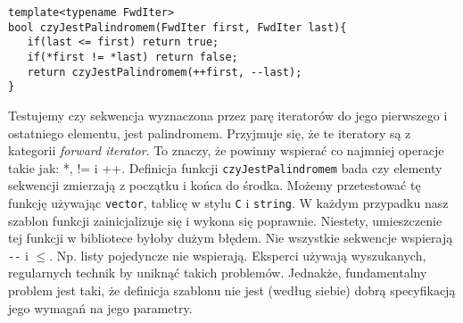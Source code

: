 \documentclass[11pt, a4paper]{article}
\begin{document}
\begin{lstlisting}[frame=single]
template<typename FwdIter>
bool czyJestPalindromem(FwdIter first, FwdIter last){
   if(last <= first) return true;
   if(*first != *last) return false;
   return czyJestPalindromem(++first, --last);
}

\end{lstlisting}

Testujemy czy sekwencja wyznaczona przez parę iteratorów do jego pierwszego i ostatniego elementu, jest palindromem. Przyjmuje się, że te iteratory są z kategorii \emph{forward iterator}. To znaczy, że powinny wspierać co najmniej operacje takie jak: *, != i ++. Definicja funkcji \verb#czyJestPalindromem# bada czy elementy sekwencji zmierzają z początku i końca do środka. Możemy przetestować tę funkcję używając \verb#vector#, tablicę w stylu \verb#C# i \verb#string#. W każdym przypadku nasz szablon funkcji zainicjalizuje się i wykona się poprawnie. Niestety, umieszczenie tej funkcji w bibliotece byłoby dużym błędem. Nie wszystkie sekwencje wspierają \verb#--# i $\leq$. Np. listy pojedyncze nie wspierają. Eksperci używają wyszukanych, regularnych technik by uniknąć takich problemów.  Jednakże, fundamentalny problem jest taki, że definicja szablonu nie jest (według siebie) dobrą specyfikacją jego wymagań na jego parametry.
\end{document}
